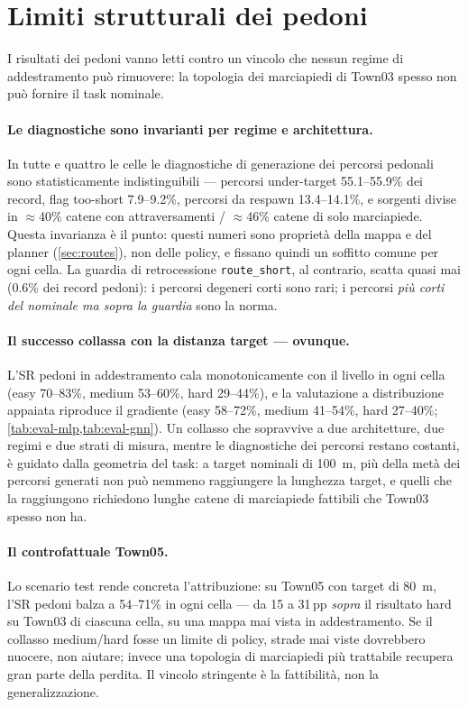 \section{Limiti strutturali dei pedoni}
\label{sec:ped-limits}

I risultati dei pedoni vanno letti contro un vincolo che nessun regime
di addestramento può rimuovere: la topologia dei marciapiedi di Town03
spesso non può fornire il task nominale.

\paragraph{Le diagnostiche sono invarianti per regime e architettura.}
In tutte e quattro le celle le diagnostiche di generazione dei percorsi
pedonali sono statisticamente indistinguibili --- percorsi under-target
55.1--55.9\% dei record, flag too-short 7.9--9.2\%, percorsi da respawn
13.4--14.1\%, e sorgenti divise in $\approx$40\% catene con
attraversamenti / $\approx$46\% catene di solo marciapiede. Questa
invarianza è il punto: questi numeri sono proprietà della mappa e del
planner (\cref{sec:routes}), non delle policy, e fissano quindi un
soffitto comune per ogni cella. La guardia di retrocessione
\texttt{route\_short}, al contrario, scatta quasi mai (0.6\% dei record
pedoni): i percorsi degeneri corti sono rari; i percorsi \emph{più
corti del nominale ma sopra la guardia} sono la norma.

\paragraph{Il successo collassa con la distanza target --- ovunque.}
L'SR pedoni in addestramento cala monotonicamente con il livello in
ogni cella (easy 70--83\%, medium 53--60\%, hard 29--44\%), e la
valutazione a distribuzione appaiata riproduce il gradiente (easy
58--72\%, medium 41--54\%, hard 27--40\%;
\cref{tab:eval-mlp,tab:eval-gnn}). Un collasso che sopravvive a due
architetture, due regimi e due strati di misura, mentre le diagnostiche
dei percorsi restano costanti, è guidato dalla geometria del task: a
target nominali di \SI{100}{m}, più della metà dei percorsi generati
non può nemmeno raggiungere la lunghezza target, e quelli che la
raggiungono richiedono lunghe catene di marciapiede fattibili che
Town03 spesso non ha.

\paragraph{Il controfattuale Town05.}
Lo scenario test rende concreta l'attribuzione: su Town05 con target di
\SI{80}{m}, l'SR pedoni balza a 54--71\% in ogni cella --- da 15 a
31\,pp \emph{sopra} il risultato hard su Town03 di ciascuna cella, su
una mappa mai vista in addestramento. Se il collasso medium/hard fosse
un limite di policy, strade mai viste dovrebbero nuocere, non aiutare;
invece una topologia di marciapiedi più trattabile recupera gran parte
della perdita. Il vincolo stringente è la fattibilità, non la
generalizzazione.

